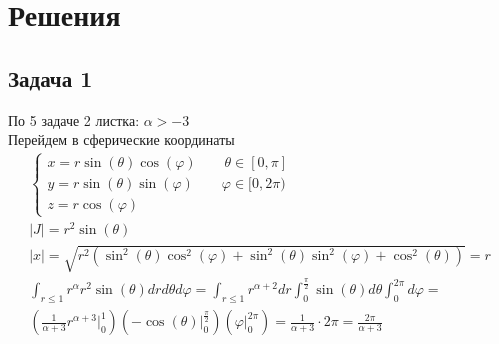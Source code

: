 
\newpage
\section*{Решения}
\subsection*{Задача 1}
	По 5 задаче 2 листка: $\alpha > -3$\\
	Перейдем в сферические координаты
	\begin{gather*}
	\begin{cases}
		x = r \sin(\theta) \cos(\varphi)\qquad \theta \in [0, \pi]\\
		y = r \sin(\theta) \sin(\varphi)\qquad \varphi \in [0, 2\pi)\\
		z = r \cos(\varphi)
	\end{cases}\\
	|J| = r^2 \sin(\theta)\\
	|x| = \sqrt{r^2 \left(\sin^2(\theta) \cos^2(\varphi) + \sin^2(\theta)\sin^2(\varphi) + \cos^2(\theta)\right)} = r\\
	\int_{r \leqslant 1} r^{\alpha} r^2 \sin(\theta) dr d \theta d \varphi =
	\int_{r \leqslant 1} r^{\alpha + 2} dr \int_{0}^{\frac{\pi}{2}} \sin(\theta) d \theta \int_{0}^{2\pi} d \varphi =\\
	\left(\frac{1}{\alpha + 3} r^{\alpha + 3} \bigg|_{0}^{1}\right)\left(-\cos(\theta)\bigg|_{0}^{\frac{\pi}{2}}\right)\left(\varphi \bigg|_{0}^{2\pi}\right) =
	\frac{1}{\alpha + 3} \cdot 2\pi = \frac{2 \pi}{\alpha + 3}
	\end{gather*}
\vskip 0.4in
